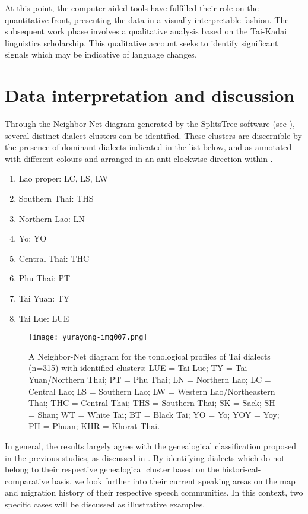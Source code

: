 \documentclass[output=paper]{langscibook}
\begin{document}
At this point, the computer-aided tools have fulfilled their role on the quantitative front, presenting the data in a visually interpretable fashion. The subsequent work phase involves a qualitative analysis based on the Tai-Kadai linguistics scholarship. This qualitative account seeks to identify significant signals which may be indicative of language changes.

\section{Data interpretation and discussion}
\label{sec:yurayong:4}
Through the Neighbor-Net diagram generated by the SplitsTree software (see ), several distinct dialect clusters can be identified. These clusters are discernible by the presence of dominant dialects indicated in the list below, and as annotated with different colours and arranged in an anti-clockwise direction within .

\begin{multicols}{2}
\begin{enumerate}
\item Lao proper: LC, LS, LW
\item Southern Thai: THS    
\item Northern Lao: LN      
\item Yo: YO            
\item Central Thai: THC
\item Phu Thai: PT
\item Tai Yuan: TY
\item Tai Lue: LUE
\end{enumerate}
\end{multicols}
  
\begin{figure}
\texttt{[image: yurayong-img007.png]}
\caption{\label{fig:yurayong:7} A Neighbor-Net diagram for the tonological profiles of Tai dialects (n=315) with identified clusters: LUE = Tai Lue; TY = Tai Yuan\slash Northern Thai; PT = Phu Thai; LN = Northern Lao; LC = Central Lao; LS = Southern Lao; LW = Western Lao\slash Northeastern Thai; THC = Central Thai; THS = Southern Thai; SK = Saek; SH = Shan; WT = White Tai; BT = Black Tai; YO = Yo; YOY = Yoy; PH = Phuan; KHR = Khorat Thai.}
\end{figure}

In general, the results largely agree with the genealogical classification proposed in the previous studies, as discussed in . By identifying dialects which do not belong to their respective genealogical cluster based on the histori\hyp cal-comparative basis, we look further into their current speaking areas on the map and migration history of their respective speech communities. In this context, two specific cases will be discussed as illustrative examples.
\end{document}

